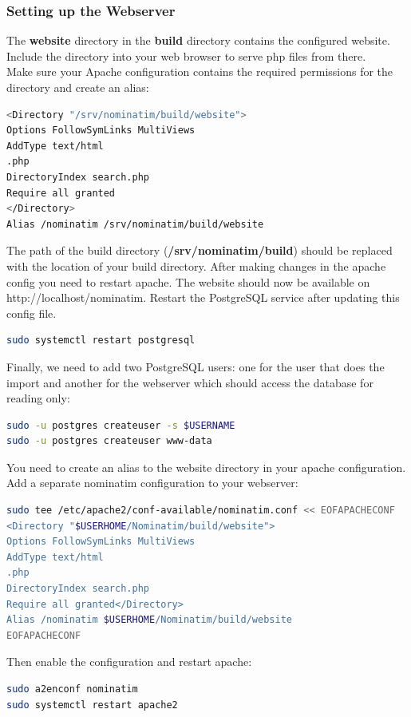 \subsubsection{Setting up the Webserver}
The \textbf{website} directory in the \textbf{build} directory contains the configured website. Include the directory into your web browser to serve php files from there.\\
Make sure your Apache configuration contains the required permissions for the directory and
create an alias:
\begin{lstlisting}[language=bash,breaklines=true]
<Directory "/srv/nominatim/build/website">
Options FollowSymLinks MultiViews
AddType text/html
.php
DirectoryIndex search.php
Require all granted
</Directory>
Alias /nominatim /srv/nominatim/build/website
\end{lstlisting}
The path of the build directory (\textbf{/srv/nominatim/build}) should be replaced with the location of your build directory. After making changes in the apache config you need to restart apache. The website should now be available on http://localhost/nominatim.
Restart the PostgreSQL service after updating this config file.
\begin{lstlisting}[language=bash,breaklines=true]
sudo systemctl restart postgresql
\end{lstlisting}
Finally, we need to add two PostgreSQL users: one for the user that does the import and another
for the webserver which should access the database for reading only:
\begin{lstlisting}[language=bash,breaklines=true]
sudo -u postgres createuser -s $USERNAME
sudo -u postgres createuser www-data
\end{lstlisting}
You need to create an alias to the website directory in your apache configuration. Add a
separate nominatim configuration to your webserver:
\begin{lstlisting}[language=bash,breaklines=true]
sudo tee /etc/apache2/conf-available/nominatim.conf << EOFAPACHECONF
<Directory "$USERHOME/Nominatim/build/website">
Options FollowSymLinks MultiViews
AddType text/html
.php
DirectoryIndex search.php
Require all granted</Directory>
Alias /nominatim $USERHOME/Nominatim/build/website
EOFAPACHECONF
\end{lstlisting}
Then enable the configuration and restart apache:
\begin{lstlisting}[language=bash,breaklines=true]
sudo a2enconf nominatim
sudo systemctl restart apache2
\end{lstlisting}

